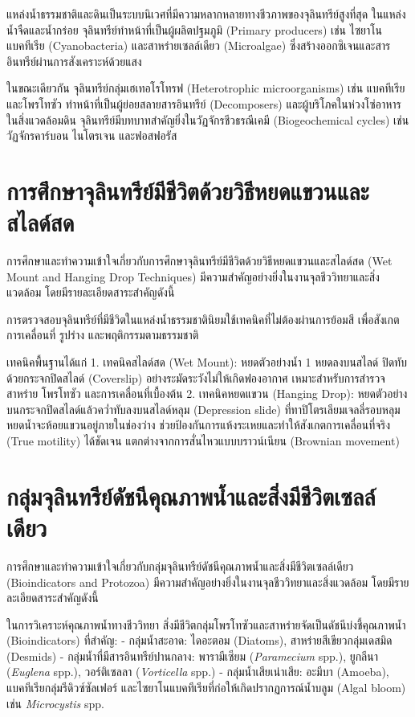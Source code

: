แหล่งน้ำธรรมชาติและดินเป็นระบบนิเวศที่มีความหลากหลายทางชีวภาพของจุลินทรีย์สูงที่สุด ในแหล่งน้ำจืดและน้ำกร่อย จุลินทรีย์ทำหน้าที่เป็นผู้ผลิตปฐมภูมิ (Primary producers) เช่น ไซยาโนแบคทีเรีย (Cyanobacteria) และสาหร่ายเซลล์เดียว (Microalgae) ซึ่งสร้างออกซิเจนและสารอินทรีย์ผ่านการสังเคราะห์ด้วยแสง

ในขณะเดียวกัน จุลินทรีย์กลุ่มเฮเทอโรโทรฟ (Heterotrophic microorganisms) เช่น แบคทีเรียและโพรโทซัว ทำหน้าที่เป็นผู้ย่อยสลายสารอินทรีย์ (Decomposers) และผู้บริโภคในห่วงโซ่อาหาร ในสิ่งแวดล้อมดิน จุลินทรีย์มีบทบาทสำคัญยิ่งในวัฏจักรชีวธรณีเคมี (Biogeochemical cycles) เช่น วัฏจักรคาร์บอน ไนโตรเจน และฟอสฟอรัส

\section{การศึกษาจุลินทรีย์มีชีวิตด้วยวิธีหยดแขวนและสไลด์สด}

การศึกษาและทำความเข้าใจเกี่ยวกับการศึกษาจุลินทรีย์มีชีวิตด้วยวิธีหยดแขวนและสไลด์สด (Wet Mount and Hanging Drop Techniques) มีความสำคัญอย่างยิ่งในงานจุลชีววิทยาและสิ่งแวดล้อม โดยมีรายละเอียดสาระสำคัญดังนี้

การตรวจสอบจุลินทรีย์ที่มีชีวิตในแหล่งน้ำธรรมชาตินิยมใช้เทคนิคที่ไม่ต้องผ่านการย้อมสี เพื่อสังเกตการเคลื่อนที่ รูปร่าง และพฤติกรรมตามธรรมชาติ

เทคนิคพื้นฐานได้แก่ 
1. เทคนิคสไลด์สด (Wet Mount): หยดตัวอย่างน้ำ 1 หยดลงบนสไลด์ ปิดทับด้วยกระจกปิดสไลด์ (Coverslip) อย่างระมัดระวังไม่ให้เกิดฟองอากาศ เหมาะสำหรับการสำรวจสาหร่าย โพรโทซัว และการเคลื่อนที่เบื้องต้น
2. เทคนิคหยดแขวน (Hanging Drop): หยดตัวอย่างบนกระจกปิดสไลด์แล้วคว่ำทับลงบนสไลด์หลุม (Depression slide) ที่ทาปิโตรเลียมเจลลี่รอบหลุม หยดน้ำจะห้อยแขวนอยู่ภายในช่องว่าง ช่วยป้องกันการแห้งระเหยและทำให้สังเกตการเคลื่อนที่จริง (True motility) ได้ชัดเจน แตกต่างจากการสั่นไหวแบบบราวน์เนียน (Brownian movement)

\section{กลุ่มจุลินทรีย์ดัชนีคุณภาพน้ำและสิ่งมีชีวิตเซลล์เดียว}

การศึกษาและทำความเข้าใจเกี่ยวกับกลุ่มจุลินทรีย์ดัชนีคุณภาพน้ำและสิ่งมีชีวิตเซลล์เดียว (Bioindicators and Protozoa) มีความสำคัญอย่างยิ่งในงานจุลชีววิทยาและสิ่งแวดล้อม โดยมีรายละเอียดสาระสำคัญดังนี้

ในการวิเคราะห์คุณภาพน้ำทางชีววิทยา สิ่งมีชีวิตกลุ่มโพรโทซัวและสาหร่ายจัดเป็นดัชนีบ่งชี้คุณภาพน้ำ (Bioindicators) ที่สำคัญ:
- กลุ่มน้ำสะอาด: ไดอะตอม (Diatoms), สาหร่ายสีเขียวกลุ่มเดสมิด (Desmids)
- กลุ่มน้ำที่มีสารอินทรีย์ปานกลาง: พารามีเซียม (\textit{Paramecium} spp.), ยูกลีนา (\textit{Euglena} spp.), วอร์ติเซลลา (\textit{Vorticella} spp.)
- กลุ่มน้ำเสียเน่าเสีย: อะมีบา (Amoeba), แบคทีเรียกลุ่มรีดิวซ์ซัลเฟอร์ และไซยาโนแบคทีเรียที่ก่อให้เกิดปรากฏการณ์น้ำบลูม (Algal bloom) เช่น \textit{Microcystis} spp.

